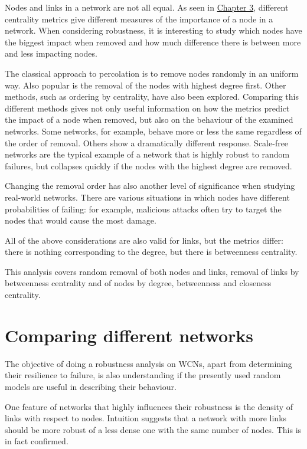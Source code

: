 \documentclass[a4paper,11pt,twoside,openleft]{memoir}
\begin{document}
Nodes and links in a network are not all equal. As seen in
\hyperref[network-topology-and-graphs]{Chapter 3}, different
centrality metrics give different measures of the importance of a node
in a network. When considering robustness, it is interesting to study
which nodes have the biggest impact when removed and how much difference
there is between more and less impacting nodes.

The classical approach to percolation is to remove nodes randomly in an
uniform way. Also popular is the removal of the nodes with highest
degree first. Other methods, such as ordering by centrality, have also
been explored. Comparing this different methods gives not only useful
information on how the metrics predict the impact of a node when
removed, but also on the behaviour of the examined networks. Some
networks, for example, behave more or less the same regardless of the
order of removal. Others show a dramatically different response.
Scale-free networks are the typical example of a network that is highly
robust to random failures, but collapses quickly if the nodes with the
highest degree are removed.

Changing the removal order has also another level of significance when
studying real-world networks. There are various situations in which
nodes have different probabilities of failing: for example, malicious
attacks often try to target the nodes that would cause the most damage.

All of the above considerations are also valid for links, but the
metrics differ: there is nothing corresponding to the degree, but there
is betweenness centrality.

This analysis covers random removal of both nodes and links, removal of
links by betweenness centrality and of nodes by degree, betweenness and
closeness centrality.

\section{Comparing different networks}\label{comparing-different-networks}

The objective of doing a robustness analysis on WCNs, apart from
determining their resilience to failure, is also understanding if the
presently used random models are useful in describing their behaviour.

One feature of networks that highly influences their robustness is the
density of links with respect to nodes. Intuition suggests that a
network with more links should be more robust of a less dense one with
the same number of nodes. This is in fact confirmed.
\end{document}
